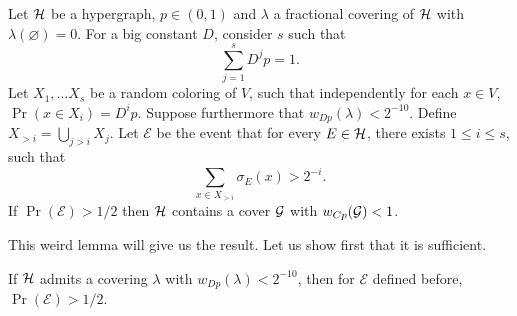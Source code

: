 \begin{lemma}
	\label{kk:weirdlemma}
	Let $\mathcal{H}$ be a hypergraph, $p \in (0,1)$ and $\lambda$ a fractional
	covering of $\mathcal{H}$ with $\lambda(\varnothing) = 0$.
	For a big constant $D$, consider $s$
	such that
	\[
		\sum_{j=1}^s D^jp = 1.
	\]
	Let $X_1, \dots X_s$ be a random coloring of $V$, such that independently for
	each $x \in V$, $\Pr(x \in X_i) = D^ip$. Suppose furthermore that $w_{Dp}(\lambda) < 2^{-10}$.
    Define $X_{>i} = \bigcup_{j > i} X_j$.
	Let $\mathcal{E}$ be the event that for every $E \in \mathcal{H}$,
	there exists $1 \leq i \leq s$, such that
	\[
		\sum_{x \in X_{>i}} \sigma_E(x) > 2^{-i}.
	\]
	If $\Pr(\mathcal{E}) > 1/2$ then $\mathcal{H}$ contains a
	cover $\mathcal{G}$ with $w_{Cp}(\mathcal{G}) < 1$.
\end{lemma}

This weird lemma will give us the result. Let us show first that it is sufficient.
\begin{lemma}
    \label{kk:prob_E}
    If $\mathcal{H}$ admits a covering $\lambda$ with $w_{Dp}(\lambda) < 2^{-10}$, then
    for $\mathcal{E}$ defined before, $\Pr(\mathcal{E}) > 1/2$.
\end{lemma}

